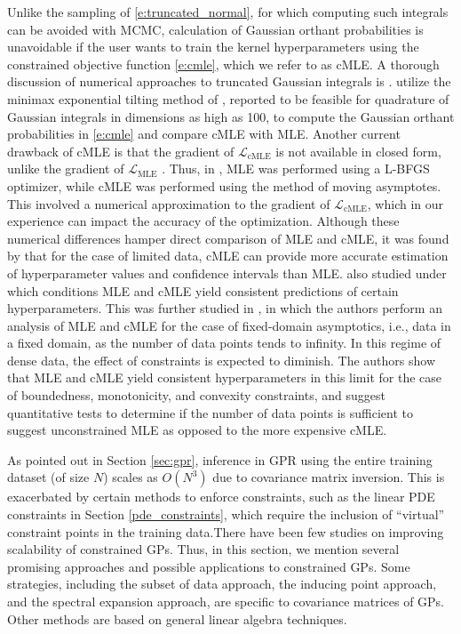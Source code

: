 Unlike the sampling of \eqref{e:truncated_normal}, for which computing such integrals can be avoided with MCMC, calculation of Gaussian orthant probabilities is unavoidable if the user wants to train the kernel hyperparameters using the constrained objective function \eqref{e:cmle}, which we refer to as cMLE. A thorough discussion of numerical approaches to truncated Gaussian integrals is .  utilize the minimax exponential tilting method of , reported to be feasible for quadrature of Gaussian integrals in dimensions as high as 100, to compute the Gaussian orthant probabilities in \eqref{e:cmle} and compare cMLE with MLE. Another current drawback of cMLE is that the gradient of $\mathcal{L}_{\text{cMLE}}$ is not available in closed form, unlike the gradient of 
$\mathcal{L}_{\text{MLE}}$ . 
Thus, in , MLE was performed using a L-BFGS optimizer, while cMLE was performed using the method of moving asymptotes. This involved a numerical approximation to the gradient of $\mathcal{L}_{\text{cMLE}}$, which in our experience can impact the accuracy of the optimization. Although these numerical differences hamper direct comparison of MLE and cMLE, it was found by  that for the case of limited data, cMLE can provide more accurate estimation of hyperparameter values and confidence intervals than MLE. 
 also studied under which conditions MLE and cMLE yield consistent predictions of certain hyperparameters. This was further studied in , in which the authors perform an analysis of MLE and cMLE for the case of fixed-domain asymptotics, i.e., data in a fixed domain, as the number of data points tends to infinity. In this regime of dense data, the effect of constraints is expected to diminish. The authors show that MLE and cMLE yield consistent hyperparameters in this limit for the case of boundedness, monotonicity, and convexity constraints, and suggest quantitative tests to determine if the number of data points is sufficient to suggest unconstrained MLE as opposed to the more expensive cMLE.

\label{sec:low_rank}
As pointed out in Section \ref{sec:gpr}, inference in GPR using the entire training dataset (of size $N$) scales as $O(N^3)$ due to covariance matrix inversion. This is exacerbated by certain methods to enforce constraints, such as the linear PDE constraints in Section \ref{pde_constraints}, which require the inclusion of ``virtual'' constraint points in the training data.There have been few studies on improving scalability of constrained GPs. Thus, in this section, we mention several promising approaches and possible applications to constrained GPs. 
Some strategies, including the subset of data approach, the inducing point approach, and the spectral expansion approach, are specific to covariance matrices of GPs. Other methods are based on general linear algebra techniques.

